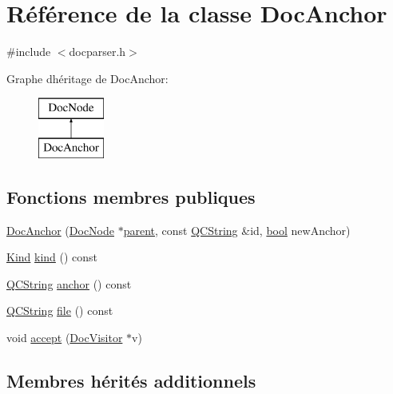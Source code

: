 \hypertarget{class_doc_anchor}{}\section{Référence de la classe Doc\+Anchor}
\label{class_doc_anchor}


{\ttfamily \#include $<$docparser.\+h$>$}

Graphe d\textquotesingle{}héritage de Doc\+Anchor\+:\begin{figure}[H]
\begin{center}
\leavevmode
\includegraphics[height=2.000000cm]{class_doc_anchor}
\end{center}
\end{figure}
\subsection*{Fonctions membres publiques}
\begin{DoxyCompactItemize}
\item 
\hyperlink{class_doc_anchor_afed6b91bf689b2ecd14b18bf9f62c3b8}{Doc\+Anchor} (\hyperlink{class_doc_node}{Doc\+Node} $\ast$\hyperlink{class_doc_node_a990d8b983962776a647e6231d38bd329}{parent}, const \hyperlink{class_q_c_string}{Q\+C\+String} \&id, \hyperlink{qglobal_8h_a1062901a7428fdd9c7f180f5e01ea056}{bool} new\+Anchor)
\item 
\hyperlink{class_doc_node_aebd16e89ca590d84cbd40543ea5faadb}{Kind} \hyperlink{class_doc_anchor_a80224579e5b31cc07fbd690678e0a4e8}{kind} () const 
\item 
\hyperlink{class_q_c_string}{Q\+C\+String} \hyperlink{class_doc_anchor_ab83e5e1213e498d587083ff7c24590c8}{anchor} () const 
\item 
\hyperlink{class_q_c_string}{Q\+C\+String} \hyperlink{class_doc_anchor_ad4670300dbd03e923efadde1ff7bf887}{file} () const 
\item 
void \hyperlink{class_doc_anchor_aab4638b79fb244e363d5d028c7a2cd65}{accept} (\hyperlink{class_doc_visitor}{Doc\+Visitor} $\ast$v)
\end{DoxyCompactItemize}
\subsection*{Membres hérités additionnels}


